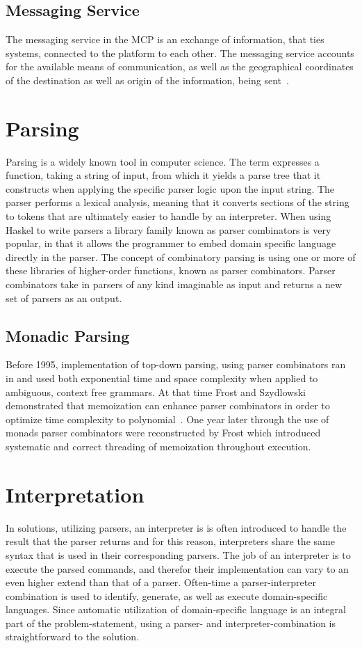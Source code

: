 \subsection{Messaging Service}
The messaging service in the MCP is an exchange of information, that ties systems, connected to the platform to each other. The messaging service accounts for the available means of communication, as well as the geographical coordinates of the destination as well as origin of the information, being sent~\cite{efficienSea2}.

\section{Parsing}
Parsing is a widely known tool in computer science. The term expresses a function, taking a string of input, from which it yields a parse tree that it constructs when applying the specific parser logic upon the input string. The parser performs a lexical analysis, meaning that it converts sections of the string to tokens that are ultimately easier to handle by an interpreter. When using Haskel to write parsers a library family known as parser combinators is very popular, in that it allows the programmer to embed domain specific language directly in the parser. The concept of combinatory parsing is using one or more of these libraries of higher-order functions, known as parser combinators. Parser combinators take in parsers of any kind imaginable as input and returns a new set of parsers as an output.
\newpage
\subsection{Monadic Parsing}
Before 1995, implementation of top-down parsing, using parser combinators ran in and used both exponential time and space complexity when applied to ambiguous, context free grammars. At that time Frost and Szydlowski demonstrated that memoization can enhance parser combinators in order to optimize time complexity to polynomial~\cite{memoization}. One year later through the use of monads parser combinators were reconstructed by Frost which introduced systematic and correct threading of memoization throughout execution.

\section{Interpretation}
In solutions, utilizing parsers, an interpreter is is often introduced to handle the result that the parser returns and for this reason, interpreters share the same syntax that is used in their corresponding parsers. The job of an interpreter is to execute the parsed commands, and therefor their implementation can vary to an even higher extend than that of a parser. Often-time a parser-interpreter combination is used to identify, generate, as well as execute domain-specific languages. Since automatic utilization of domain-specific language is an integral part of the problem-statement, using a parser- and interpreter-combination is straightforward to the solution.

